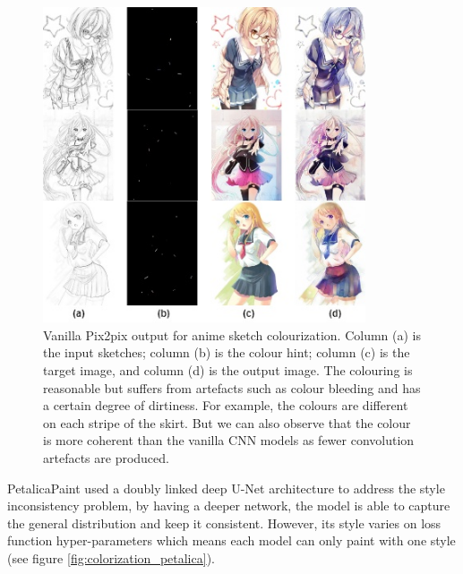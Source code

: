 \begin{figure}
    \centering
    \includegraphics[width=0.85\textwidth]{images/colorization/pix2pix.jpg}
    \caption[Vanilla Pix2pix output for anime sketch colourization.]{Vanilla Pix2pix output for anime sketch colourization. Column (a) is the input sketches; column (b) is the colour hint; column (c) is the target image, and column (d) is the output image.\cite{steinsDeepLearningProject2022} The colouring is reasonable but suffers from artefacts such as colour bleeding and has a certain degree of dirtiness. For example, the colours are different on each stripe of the skirt. But we can also observe that the colour is more coherent than the vanilla CNN models as fewer convolution artefacts are produced.} 
    \label{fig:colorization_pix2pix}
\end{figure}

PetalicaPaint\cite{PetalicaPaint} used a doubly linked deep U-Net architecture to address the style inconsistency problem, by having a deeper network, the model is able to capture the general distribution and keep it consistent. However, its style varies on loss function hyper-parameters which means each model can only paint with one style (see figure \ref{fig:colorization_petalica}).

